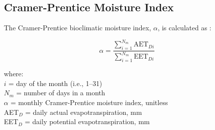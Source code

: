 \subsection{Cramer-Prentice Moisture Index}
\label{sec:alpha}
The Cramer-Prentice bioclimatic moisture index, $\alpha$, is calculated as \parencite[as described in][]{sykes96, gallego-sala10}:

\begin{equation}
\label{eq:alpha}
	\alpha = \frac{\sum_{i=1}^{N_m} \text{AET}_{Di}}
	              {\sum_{i=1}^{N_m} \text{EET}_{Di}}
\end{equation}

\noindent where:\\
\indent $i$ = day of the month (i.e., 1--31) \\
\indent $N_m$ = number of days in a month \\
\indent $\alpha$ = monthly Cramer-Prentice moisture index, unitless \\
\indent AET$_D$ = daily actual evapotranspiration, mm\\
\indent EET$_D$ = daily potential evapotranspiration, mm\\

